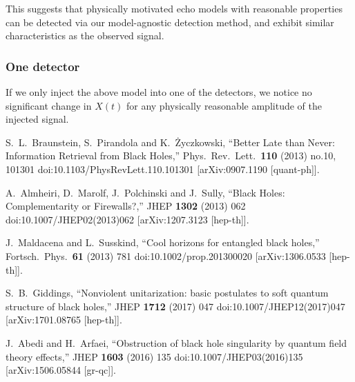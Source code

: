 \documentclass[a4paper,11pt]{article}
\begin{document}
This suggests that physically motivated echo models with reasonable properties can be detected via our model-agnostic detection method, and exhibit similar characteristics as the observed signal. 



\subsubsection{One detector}
If we only inject the above model into one of the detectors, we notice no significant change in $X(t)$ for any physically reasonable amplitude of the injected signal.





\begin{thebibliography}{99}

  S.~L.~Braunstein, S.~Pirandola and K.~Życzkowski,
  ``Better Late than Never: Information Retrieval from Black Holes,''
  Phys.\ Rev.\ Lett.\  {\bf 110} (2013) no.10,  101301
  doi:10.1103/PhysRevLett.110.101301
  [arXiv:0907.1190 [quant-ph]].
  
  A.~Almheiri, D.~Marolf, J.~Polchinski and J.~Sully,
  ``Black Holes: Complementarity or Firewalls?,''
  JHEP {\bf 1302} (2013) 062
  doi:10.1007/JHEP02(2013)062
  [arXiv:1207.3123 [hep-th]].
  
  J.~Maldacena and L.~Susskind,
  ``Cool horizons for entangled black holes,''
  Fortsch.\ Phys.\  {\bf 61} (2013) 781
  doi:10.1002/prop.201300020
  [arXiv:1306.0533 [hep-th]].
  
  S.~B.~Giddings,
  ``Nonviolent unitarization: basic postulates to soft quantum structure of black holes,''
  JHEP {\bf 1712} (2017) 047
  doi:10.1007/JHEP12(2017)047
  [arXiv:1701.08765 [hep-th]].

  J.~Abedi and H.~Arfaei,
  ``Obstruction of black hole singularity by quantum field theory effects,''
  JHEP {\bf 1603} (2016) 135
  doi:10.1007/JHEP03(2016)135
  [arXiv:1506.05844 [gr-qc]].


\end{thebibliography}
\end{document}

